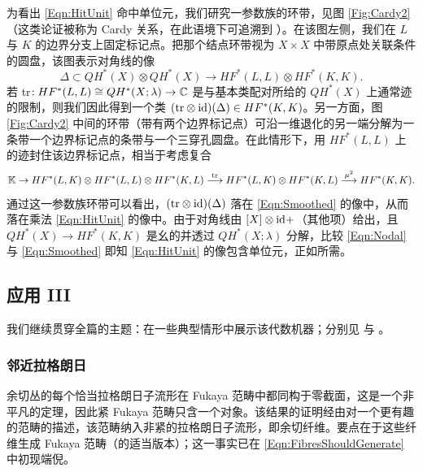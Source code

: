 为看出 \eqref{Eqn:HitUnit} 命中单位元，我们研究一参数族的环带，见图 \ref{Fig:Cardy2}（这类论证被称为 Cardy 关系，在此语境下可追溯到 \cite{BiranCornea}）。在该图左侧，我们在 $L$ 与 $K$ 的边界分支上固定标记点。把那个结点环带视为 $X\times X$ 中带原点处关联条件的圆盘，该图表示对角线的像
\begin{equation} \label{Eqn:Nodal}
\Delta \subset QH^*(X) \otimes QH^*(X) \longrightarrow HF^*(L,L) \otimes HF^*(K,K).
\end{equation}
若 tr$: HF^*(L,L) \cong QH^*(X;\lambda) \rightarrow \mathbb{C}$ 是与基本类配对所给的 $QH^*(X)$ 上通常迹的限制，则我们因此得到一个类 $(\mathrm{tr} \otimes \mathrm{id})(\Delta) \in HF^*(K,K)$。另一方面，图 \ref{Fig:Cardy2} 中间的环带（带有两个边界标记点）可沿一维退化的另一端分解为一条带一个边界标记点的条带与一个三穿孔圆盘。在此情形下，用 $HF^*(L,L)$ 上的迹封住该边界标记点，相当于考虑复合
\begin{equation} \label{Eqn:Smoothed}
\mathbb{K} \rightarrow HF^*(L,K) \otimes HF^*(L,L) \otimes HF^*(K,L) \stackrel{\mathrm{tr}}{\longrightarrow} HF^*(L,K) \otimes HF^*(K,L) \stackrel{\mu^2}{\longrightarrow}HF^*(K,K). 
\end{equation}
通过这一参数族环带可以看出，$(\mathrm{tr}\otimes \mathrm{id})(\Delta)$ 落在 \eqref{Eqn:Smoothed} 的像中，从而落在乘法 \eqref{Eqn:HitUnit} 的像中。由于对角线由 $[X]\otimes \mathrm{id} + $（其他项）给出，且 $QH^*(X) \rightarrow HF^*(K,K)$ 是幺的并透过 $QH^*(X;\lambda)$ 分解，比较 \eqref{Eqn:Nodal} 与 \eqref{Eqn:Smoothed} 即知 \eqref{Eqn:HitUnit} 的像包含单位元，正如所需。

\subsection{应用 III}

我们继续贯穿全篇的主题：在一些典型情形中展示该代数机器；分别见 \cite{FSS,Nadler} 与 \cite{AbouzaidSmith:plumbing}。

\subsubsection{邻近拉格朗日\label{Sec:NearbyLag}}

余切丛的每个恰当拉格朗日子流形在 Fukaya 范畴中都同构于零截面，这是一个非平凡的定理，因此紧 Fukaya 范畴只含一个对象。该结果的证明经由对一个更有趣的范畴的描述，该范畴纳入非紧的拉格朗日子流形，即余切纤维。要点在于这些纤维生成 Fukaya 范畴（的适当版本）；这一事实已在 \eqref{Eqn:FibresShouldGenerate} 中初现端倪。

